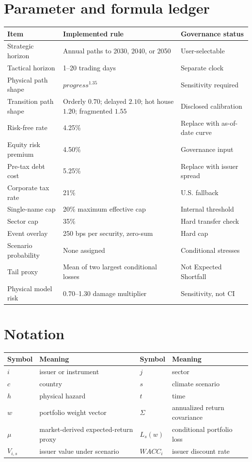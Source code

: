 \documentclass[10pt]{article}
\begin{document}
\appendix
\section{Parameter and formula ledger}

\begin{tabularx}{\textwidth}{p{1.55in}X p{1.25in}}
\toprule
Item & Implemented rule & Governance status \\
\midrule
Strategic horizon & Annual paths to 2030, 2040, or 2050 & User-selectable \\
Tactical horizon & 1--20 trading days & Separate clock \\
Physical path shape & $progress^{1.35}$ & Sensitivity required \\
Transition path shape & Orderly $0.70$; delayed $2.10$; hot house $1.20$; fragmented $1.55$ & Disclosed calibration \\
Risk-free rate & 4.25\% & Replace with as-of-date curve \\
Equity risk premium & 4.50\% & Governance input \\
Pre-tax debt cost & 5.25\% & Replace with issuer spread \\
Corporate tax rate & 21\% & U.S. fallback \\
Single-name cap & 20\% maximum effective cap & Internal threshold \\
Sector cap & 35\% & Hard transfer check \\
Event overlay & 250 bps per security, zero-sum & Hard cap \\
Scenario probability & None assigned & Conditional stresses \\
Tail proxy & Mean of two largest conditional losses & Not Expected Shortfall \\
Physical model risk & 0.70--1.30 damage multiplier & Sensitivity, not CI \\
\bottomrule
\end{tabularx}

\section{Notation}
\begin{tabularx}{\textwidth}{p{0.75in}X p{0.75in}X}
\toprule
Symbol & Meaning & Symbol & Meaning \\
\midrule
$i$ & issuer or instrument & $j$ & sector \\
$c$ & country & $s$ & climate scenario \\
$h$ & physical hazard & $t$ & time \\
$w$ & portfolio weight vector & $\Sigma$ & annualized return covariance \\
$\mu$ & market-derived expected-return proxy & $L_s(w)$ & conditional portfolio loss \\
$V_{i,s}$ & issuer value under scenario & $WACC_i$ & issuer discount rate \\
\bottomrule
\end{tabularx}
\end{document}
